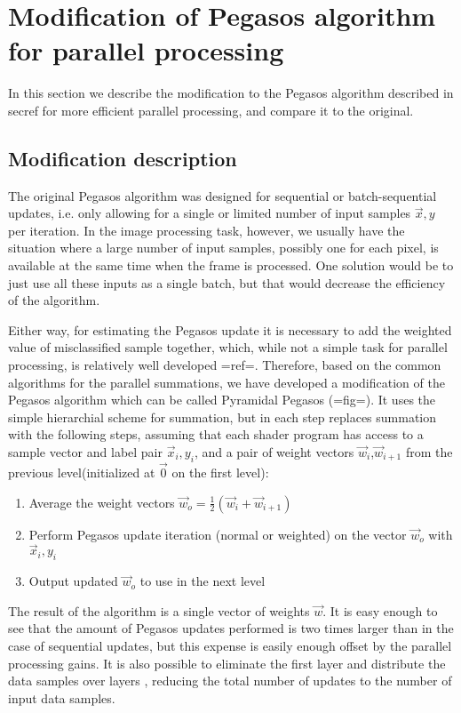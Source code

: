\section{Modification of Pegasos algorithm for parallel processing}

In this section we describe the modification to the Pegasos algorithm described in secref for more efficient parallel processing, and compare it to the original.
\subsection{Modification description}
The original Pegasos algorithm was designed for sequential or batch-sequential updates, i.e. only allowing for a single or limited number of input samples $\vec{x},y$ per iteration. In the image processing task, however, we usually have the situation where a large number of input samples, possibly one for each pixel, is available at the same time when the frame is processed. One solution would be to just use all these inputs as a single batch, but that would decrease the efficiency of the algorithm.

Either way, for estimating the Pegasos update it is necessary to add the weighted value of misclassified sample together, which, while not a simple task for parallel processing, is relatively well developed {{=ref=}}. Therefore, based on the common algorithms for the parallel summations, we have developed a modification of the Pegasos algorithm which can be called Pyramidal Pegasos ({{=fig=}}). It uses the simple hierarchial scheme for summation, but in each step replaces summation with the following steps, assuming that each shader program has access to a sample vector and label pair $\vec{x}_i, y_i$, and a pair of weight vectors $\vec{w}_{i}$,$\vec{w}_{i+1}$ from the previous level(initialized at $\vec{0}$ on the first level):
\begin{enumerate}
\item Average the weight vectors $\vec{w}_o=\frac{1}{2}\left(\vec{w}_{i}+\vec{w}_{i+1}\right)$
\item Perform Pegasos update iteration (normal or weighted) on the vector $\vec{w}_o$ with $\vec{x}_i, y_i$
\item Output updated $\vec{w}_o$ to use in the next level 
\end{enumerate}
The result of the algorithm is a single vector of weights $\vec{w}$. It is easy enough to see that the amount of Pegasos updates performed is two times larger than in the case of sequential updates, but this expense is easily enough offset by the parallel processing gains. It is also possible to eliminate the first layer and distribute the data samples over layers , reducing the total number of updates to the number of input data samples.
